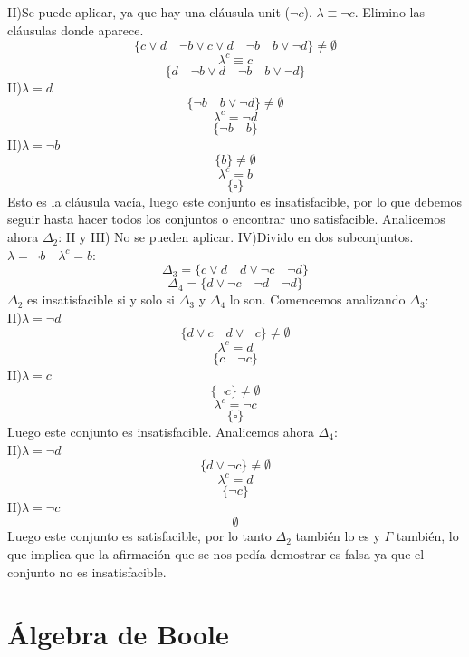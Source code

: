 \documentclass[a4paper]{article}
\theoremstyle{plain} \newtheorem{PrimerPrincipio}{Teorema}
\theoremstyle{plain} \newtheorem{SegundoPrincipio}{Teorema}
\begin{document}
II)Se puede aplicar, ya que hay una cláusula unit ($\neg c$). $\lambda\equiv\neg c$. Elimino las cláusulas donde aparece.
$$\{ c\lor d\quad\neg b\lor c\lor d\quad\neg b\quad b\lor\neg d \}\neq \emptyset$$
$$\lambda^c\equiv c$$
$$\{d\quad\neg b\lor d\quad\neg b\quad b\lor\neg d\}$$
II)$\lambda=d$
$$\{\neg b\quad b\lor\neg d\}\neq\emptyset$$
$$\lambda^c=\neg d$$
$$\{\neg b\quad b\}$$
II)$\lambda=\neg b$
$$\{b\}\neq\emptyset$$
$$\lambda^c=b$$
$$\{\square\}$$
Esto es la cláusula vacía, luego este conjunto es insatisfacible, por lo que debemos seguir hasta hacer todos los conjuntos o encontrar uno satisfacible. Analicemos ahora $\Delta_2$:
II y III) No se pueden aplicar.
IV)Divido en dos subconjuntos. $\lambda=\neg b \quad \lambda^c=b$:
$$\Delta_3=\{c\lor d\quad d\lor\neg c\quad\neg d\}$$
$$\Delta_4=\{d\lor\neg c\quad\neg d\quad\neg d\}$$
$\Delta_2$ es insatisfacible si y solo si $\Delta_3$ y $\Delta_4$ lo son. Comencemos analizando $\Delta_3$:\\
II)$\lambda=\neg d$
$$\{d\lor c\quad d\lor\neg c\}\neq\emptyset$$
$$\lambda^c=d$$
$$\{c\quad\neg c\}$$
II)$\lambda=c$
$$\{\neg c\}\neq\emptyset$$
$$\lambda^c=\neg c$$
$$\{\square\}$$
Luego este conjunto es insatisfacible. Analicemos ahora $\Delta_4$:\\
II)$\lambda=\neg d$
$$\{d\lor\neg c\}\neq\emptyset$$
$$\lambda^c=d$$
$$\{\neg c\}$$
II)$\lambda=\neg c$
$$\emptyset$$
Luego este conjunto es satisfacible, por lo tanto $\Delta_2$ también lo es y $\Gamma$ también, lo que implica que la afirmación que se nos pedía demostrar es falsa ya que el conjunto no es insatisfacible.

\section{Álgebra de Boole}
\end{document}
